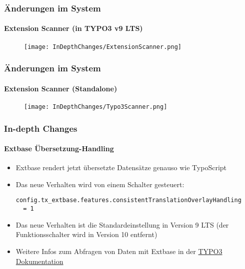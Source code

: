 
\begin{frame}[fragile]
	\frametitle{Änderungen im System}
	\framesubtitle{Extension Scanner (in TYPO3 v9 LTS)}

	\begin{figure}
		\texttt{[image: InDepthChanges/ExtensionScanner.png]}
	\end{figure}

\end{frame}


\begin{frame}[fragile]
	\frametitle{Änderungen im System}
	\framesubtitle{Extension Scanner (Standalone)}

	\begin{figure}
		\texttt{[image: InDepthChanges/Typo3Scanner.png]}
	\end{figure}

\end{frame}


\begin{frame}[fragile]
	\frametitle{In-depth Changes}
	\framesubtitle{Extbase Übersetzung-Handling}

	\lstset{basicstyle=\footnotesize\ttfamily}

	\begin{itemize}
		\item Extbase rendert jetzt übersetzte Datensätze genauso wie 
			TypoScript
		\item Das neue Verhalten wird von einem Schalter gesteuert:

\begin{lstlisting}
config.tx_extbase.features.consistentTranslationOverlayHandling
  = 1
\end{lstlisting}

		\item Das neue Verhalten ist die Standardeinstellung in Version 9 LTS (der Funktionsschalter wird
			in Version 10 entfernt)
		\item Weitere Infos zum Abfragen von Daten mit Extbase in der
			\href{https://github.com/TYPO3/TYPO3.CMS/blob/master/typo3/sysext/core/Documentation/Changelog/9.5/Important-82363-MakeExtBaseTranslationHandlingConsistentWithTyposcript.rst}{TYPO3 Dokumentation}

	\end{itemize}

\end{frame}


